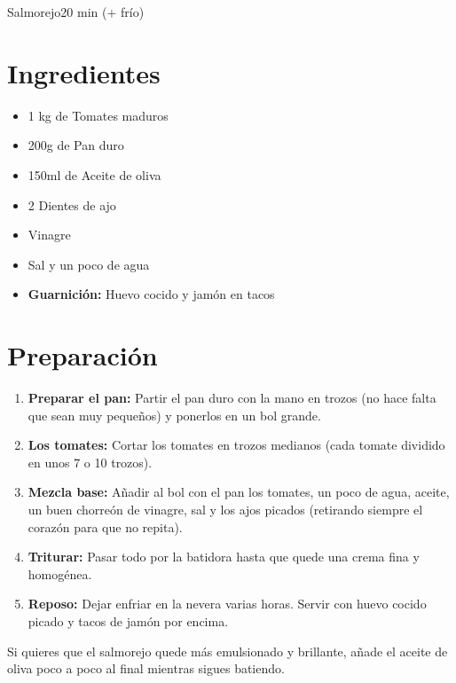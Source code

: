 \begin{receta}{Salmorejo}{20 min (+ frío)}
    
    \begin{minipage}[t]{0.35\textwidth}
        \section*{Ingredientes}
        \begin{itemize}[leftmargin=*]
            \item 1 kg de Tomates maduros
            \item 200g de Pan duro
            \item 150ml de Aceite de oliva
            \item 2 Dientes de ajo
            \item Vinagre
            \item Sal y un poco de agua
            \item \textbf{Guarnición:} Huevo cocido y jamón en tacos
        \end{itemize}
    \end{minipage}
    \hfill
    \begin{minipage}[t]{0.6\textwidth}
        \section*{Preparación}
        \begin{enumerate}
            \item \textbf{Preparar el pan:} Partir el pan duro con la mano en trozos (no hace falta que sean muy pequeños) y ponerlos en un bol grande.
            \item \textbf{Los tomates:} Cortar los tomates en trozos medianos (cada tomate dividido en unos 7 o 10 trozos).
            \item \textbf{Mezcla base:} Añadir al bol con el pan los tomates, un poco de agua, aceite, un buen chorreón de vinagre, sal y los ajos picados (retirando siempre el corazón para que no repita).
            \item \textbf{Triturar:} Pasar todo por la batidora hasta que quede una crema fina y homogénea.
            \item \textbf{Reposo:} Dejar enfriar en la nevera varias horas. Servir con huevo cocido picado y tacos de jamón por encima.
        \end{enumerate}
    \end{minipage}

    \vspace{1em}
    \begin{tcolorbox}[colback=orange!5, colframe=orange!50, title=Truco, size=small]
        Si quieres que el salmorejo quede más emulsionado y brillante, añade el aceite de oliva poco a poco al final mientras sigues batiendo.
    \end{tcolorbox}
\end{receta}